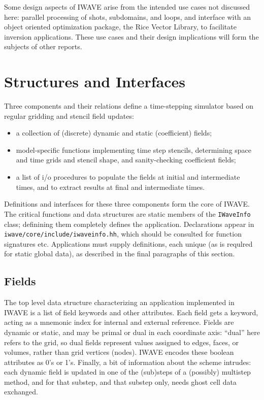 Some design aspects of IWAVE arise from the intended use cases not
discussed here: parallel processing of shots, subdomains, and loops,
and interface with an object oriented optimization package, the Rice
Vector Library, to facilitate inversion applications. These use cases
and their design implications will form the subjects of other reports.

\section{Structures and Interfaces}
Three components and their relations define a time-stepping simulator
based on regular gridding and stencil field updates:
\begin{itemize}
\item a collection of (discrete) dynamic and static (coefficient) fields;
\item model-specific functions implementing time step stencils, 
  determining space and time grids and stencil shape, and
  sanity-checking coefficient fields;
\item a list of i/o procedures to populate the fields at initial and
  intermediate times, and to extract results at final and intermediate
  times.
\end{itemize}
Definitions and interfaces for these three components form the core of
IWAVE. The critical functions and data structures are static members of the {\tt IWaveInfo} class;
definining them completely defines the application. Declarations
appear in \\{\tt iwave/core/include/iwaveinfo.hh}, which should be
consulted for function signatures etc. Applications must supply
definitions, each unique (as is requlred for static global data), as
described in the final paragraphs of this section.

\subsection{Fields}
The top level data structure characterizing an application implemented
in IWAVE is a list of field keywords and other attributes. Each field
gets a keyword, acting as a mnemonic index for internal and external
reference. Fields are dynamic or static, and may be primal or dual in
each coordinate axis: ``dual'' here refers to the grid, so dual fields
represent values assigned to edges, faces, or volumes, rather than
grid vertices (nodes). IWAVE encodes these boolean attributes as 0's
or 1's. Finally, a bit of information about the scheme intrudes: each
dynamic field is updated in one of the (sub)steps of a (possibly)
multistep method, and for that substep, and that substep only, needs
ghost cell data exchanged.

